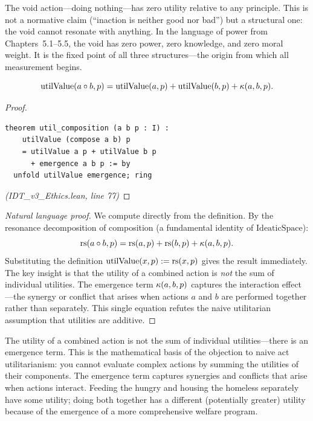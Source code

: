 \begin{remark}
The void action---doing nothing---has zero utility relative to any principle.
This is not a normative claim (``inaction is neither good nor bad'') but a
structural one: the void cannot resonate with anything. In the language of
power from Chapters~5.1--5.5, the void has zero power, zero knowledge, and
zero moral weight. It is the fixed point of all three structures---the origin
from which all measurement begins.
\end{remark}

\begin{theorem}
\label{thm:util-composition}
\[
  \mathrm{utilValue}(a \circ b, p) = \mathrm{utilValue}(a, p) + \mathrm{utilValue}(b, p) + \kappa(a, b, p).
\]
\end{theorem}

\begin{proof}
\begin{lstlisting}
theorem util_composition (a b p : I) :
    utilValue (compose a b) p
    = utilValue a p + utilValue b p
      + emergence a b p := by
  unfold utilValue emergence; ring
\end{lstlisting}
\textit{(IDT\_v3\_Ethics.lean, line 77)}
\end{proof}

\begin{proof}[Natural language proof]
We compute directly from the definition. By the resonance decomposition
of composition (a fundamental identity of $\mathrm{IdeaticSpace}$):
\[
  \mathrm{rs}(a \circ b, p) = \mathrm{rs}(a, p) + \mathrm{rs}(b, p) + \kappa(a, b, p).
\]
Substituting the definition $\mathrm{utilValue}(x, p) := \mathrm{rs}(x, p)$ gives
the result immediately. The key insight is that the utility of a combined
action is \emph{not} the sum of individual utilities. The emergence term
$\kappa(a,b,p)$ captures the interaction effect---the synergy or conflict
that arises when actions $a$ and $b$ are performed together rather than
separately. This single equation refutes the naive utilitarian assumption
that utilities are additive.
\end{proof}

\begin{interpretation}
The utility of a combined action is not the sum of individual utilities---there
is an emergence term. This is the mathematical basis of the objection to naive
act utilitarianism: you cannot evaluate complex actions by summing the utilities
of their components. The emergence term captures synergies and conflicts that
arise when actions interact. Feeding the hungry and housing the homeless
separately have some utility; doing both together has a different (potentially
greater) utility because of the emergence of a more comprehensive welfare
program.
\end{interpretation}

